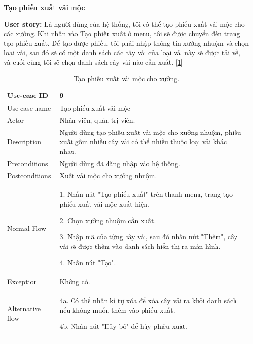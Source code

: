 \newpage
\textbf{Tạo phiếu xuất vải mộc}\par
\textbf{User story:} Là người dùng của hệ thống, tôi có thể tạo phiếu xuất vải mộc cho các xưởng. Khi nhấn vào Tạo phiếu xuất ở menu, tôi sẽ được chuyển đến trang tạo phiếu xuất. Để tạo được phiếu, tôi phải nhập thông tin xưởng nhuộm và chọn loại vải, sau đó sẽ có một danh sách các cây vải của loại vải này sẽ được tải về, và cuối cùng tôi sẽ chọn danh sách cây vải nào cần xuất. [\ref{bang9}]
\begin{table}[!htp]
    \centering
    \begin{tabular}{|m{3cm}|m{10cm}|}
    \hline 
        Use-case ID & 9\\ \hline
        Use-case name & Tạo phiếu xuất vải mộc\\ \hline
        Actor & Nhân viên, quản trị viên.\\ \hline
        Description & Người dùng tạo phiếu xuất vải mộc cho xưởng nhuộm, phiếu xuất gồm nhiều cây vải có thể nhiều thuộc loại vải khác nhau.\\ \hline
        Preconditions & Người dùng đã đăng nhập vào hệ thống.
        \\ \hline
        Postconditions & Xuất vải mộc cho xưởng nhuộm.\\ \hline
        Normal Flow & 
        1. Nhấn nút "Tạo phiếu xuất" trên thanh menu, trang tạo phiếu xuất vải mộc xuất hiện.\par
        2. Chọn xưởng nhuộm cần xuất.\par
        3. Nhập mã của từng cây vải, sau đó nhấn nút "Thêm", cây vải sẽ được thêm vào danh sách hiển thị ra màn hình.\par
        4. Nhấn nút "Tạo".
        \\ \hline
        Exception & Không có.
        \\ \hline
        Alternative flow & 
        4a. Có thể nhấn kí tự xóa để xóa cây vải ra khỏi danh sách nếu không muốn thêm vào phiếu xuất.\par
        4b. Nhấn nút "Hủy bỏ" để hủy phiếu xuất.
        \\ 
    \hline 
    \end{tabular}
    \caption{Tạo phiếu xuất vải mộc cho xưởng.}
    \label{bang9}
\end{table}

